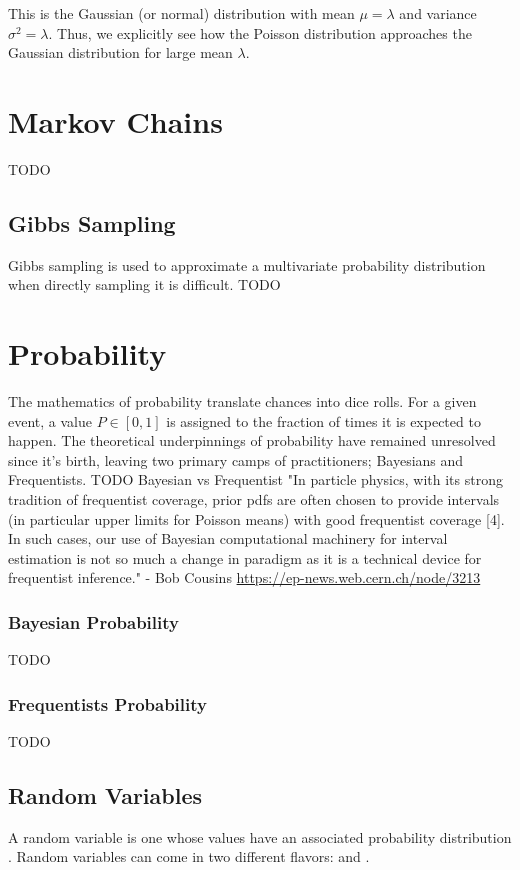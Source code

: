 This is the Gaussian (or normal) distribution with mean $\mu = \lambda$ and variance $\sigma^2 = \lambda$. Thus, we explicitly see how the Poisson distribution approaches the Gaussian distribution for large mean $\lambda$.




\section{Markov Chains}
TODO

\subsection{Gibbs Sampling}
Gibbs sampling is used to approximate a multivariate probability distribution when directly sampling it is difficult. 
TODO

\section{Probability}
The mathematics of probability translate chances into dice rolls. For a given event, a value $P\in[0,1]$ is assigned to the fraction of times it is expected to happen. The theoretical underpinnings of probability have remained unresolved since it's birth, leaving two primary camps of practitioners; Bayesians and Frequentists.
TODO Bayesian vs Frequentist
"In particle physics, with its strong tradition of frequentist coverage, prior pdfs are often chosen to provide intervals (in particular upper limits for Poisson means) with good frequentist coverage [4]. In such cases, our use of Bayesian computational machinery for interval estimation is not so much a change in paradigm as it is a technical device for frequentist inference." - Bob Cousins \url{https://ep-news.web.cern.ch/node/3213}
\subsubsection{Bayesian Probability}
TODO
\subsubsection{Frequentists Probability}
TODO



\subsection{Random Variables}
A random variable is one whose values have an associated probability distribution \cite{grus}. Random variables can come in two different flavors:  and . 

